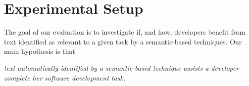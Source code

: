 \clearpage

\section{Experimental Setup}
\label{cp6:procedures}



The goal of our evaluation is to investigate if, and how, developers benefit from
text identified as relevant to a given task by a semantic-based techniques. 
Our main hypothesis is that


\medskip
\begin{bluequote}
    \textit{text automatically identified by a semantic-based technique assists a 
    developer complete her software development task.} 
\end{bluequote}



